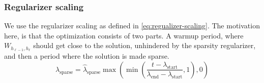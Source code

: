 \subsubsection{Regularizer scaling}
We use the regularizer scaling as defined in \eqref{eq:regualizer-scaling}. The motivation here, is that the optimization consists of two parts. A warmup period, where $W_{h_{\ell-1},h_\ell}$ should get close to the solution, unhindered by the sparsity regularizer, and then a period where the solution is made sparse.
\begin{equation}
\lambda_{\mathrm{sparse}} = \hat{\lambda}_{\mathrm{sparse}} \max\left(\min\left(\frac{t - \lambda_{\mathrm{start}}}{\lambda_{\mathrm{end}} - \lambda_{\mathrm{start}}}, 1\right), 0\right)
\label{eq:regualizer-scaling}
\end{equation}
